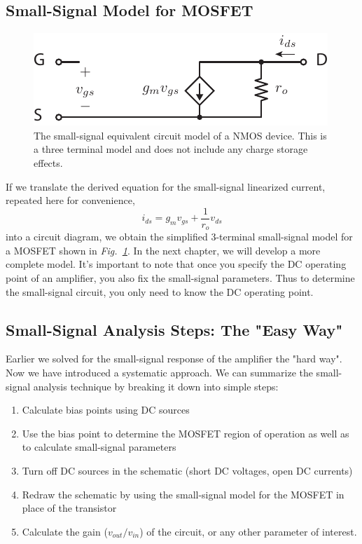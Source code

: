 \subsection{Small-Signal Model for MOSFET}
\begin{figure}[tb]
\centering
\includegraphics[scale=1]{mos3term_ac_nocap}
\caption{The small-signal equivalent circuit model of a NMOS device.  This is a three terminal model and does not include any charge storage effects.}
\label{fig:mos3term_ac_nocap}
\end{figure}
If we translate the derived equation for the small-signal linearized current, repeated here for convenience,
    \begin{equation}
        {i_{ds}} = {g_m}{v_{gs}} + \frac{1}{{{r_o}}}{v_{ds}}
    \end{equation}
into a circuit diagram, we obtain the simplified  3-terminal small-signal model for a MOSFET shown in \emph{Fig.~\ref{fig:mos3term_ac_nocap}}.  In the next chapter, we will develop a more complete model.  It's important to note that once you specify the DC operating point of an amplifier, you also fix the small-signal parameters.  Thus to determine the small-signal circuit, you only need to know the DC operating point.
\subsection{Small-Signal Analysis Steps:  The "Easy Way"}
Earlier we solved for the small-signal response of the amplifier the "hard way".  Now we have introduced a systematic approach.  We can summarize the small-signal analysis technique by breaking it down into simple steps:
    \begin{enumerate}
    	\item  Calculate bias points using DC sources
    	\item  Use the bias point to determine the MOSFET region of operation as well as to calculate small-signal parameters
    	\item  Turn off DC sources in the schematic (short DC voltages, open DC currents)
    	\item  Redraw the schematic by using the small-signal model for the MOSFET in place of the transistor
    	\item  Calculate the gain ($v_{out}/v_{in}$) of the circuit, or any other parameter of interest.
    \end{enumerate}

